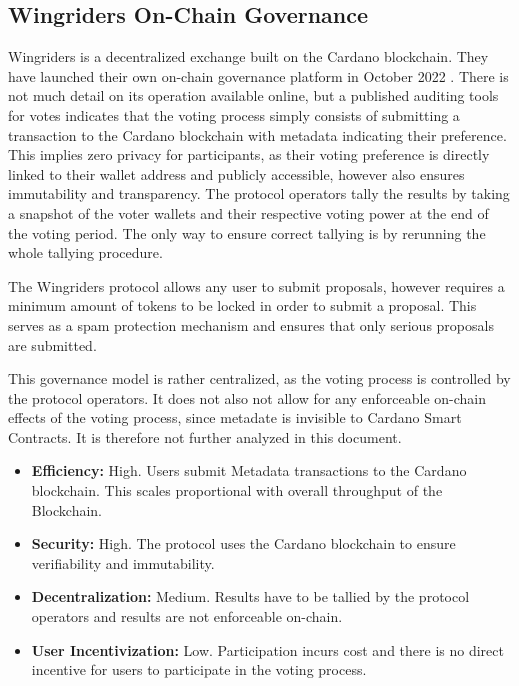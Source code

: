 \documentclass[11pt]{article}
\begin{document}
\subsection{Wingriders On-Chain Governance}

Wingriders is a decentralized exchange built on the Cardano blockchain.
They have launched their own on-chain governance platform in October 2022 \cite{wingriders-medium}.
There is not much detail on its operation available online, but a published auditing tools for votes
indicates that the voting process simply consists of submitting a transaction to the Cardano blockchain with metadata indicating their preference.
This implies zero privacy for participants, as their voting preference is directly linked to their wallet address and publicly accessible,
however also ensures immutability and transparency.
The protocol operators tally the results by taking a snapshot of the voter wallets and their respective voting power at the end of the voting period. \cite{wingriders-github}
The only way to ensure correct tallying is by rerunning the whole tallying procedure.

The Wingriders protocol allows any user to submit proposals,
however requires a minimum amount of tokens to be locked in order to submit a proposal.
This serves as a spam protection mechanism and ensures that only serious proposals are submitted.

This governance model is rather centralized, as the voting process is controlled by the protocol operators.
It does not also not allow for any enforceable on-chain effects of the voting process,
since metadate is invisible to Cardano Smart Contracts.
It is therefore not further analyzed in this document.

\begin{itemize}
    \item \textbf{Efficiency:} High. Users submit Metadata transactions to the Cardano blockchain. This scales proportional with overall throughput of the Blockchain.
    \item \textbf{Security:} High. The protocol uses the Cardano blockchain to ensure verifiability and immutability.
    \item \textbf{Decentralization:} Medium. Results have to be tallied by the protocol operators and results are not enforceable on-chain.
    \item \textbf{User Incentivization:} Low. Participation incurs cost and there is no direct incentive for users to participate in the voting process.
\end{itemize}
\end{document}
